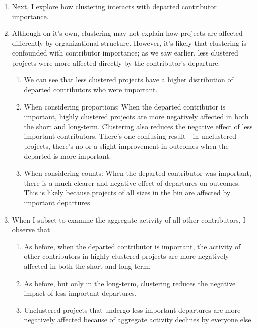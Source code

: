 \subsubsection{}
\begin{enumerate}
    \item Next, I explore how clustering interacts with departed contributor importance. 
    \item Although on it's own, clustering may not explain how projects are affected differently by organizational structure. However, it's likely that clustering is confounded with contributor importance; as we saw earlier, less clustered projects were more affected directly by the contributor's departure. 
    \begin{enumerate}
        \item We can see that less clustered projects have a higher distribution of departed contributors who were important.
        \item When considering proportions: When the departed contributor is important, highly clustered projects are more negatively affected in both the short and long-term. Clustering also reduces the negative effect of less important contributors. 
        There's one confusing result - in unclustered projects, there's no or a slight improvement in outcomes when the departed is more important.  
        \item When considering counts: When the departed contributor was important, there is a much clearer and negative effect of departures on outcomes. This is likely because projects of all sizes in the bin are affected by important departures. 
    \end{enumerate}
    \item When I subset to examine the aggregate activity of all other contributors, I observe that
    \begin{enumerate}
        \item As before, when the departed contributor is important, the activity of other contributors in highly clustered projects are more negatively affected in both the short and long-term. 
        \item As before, but only in the long-term, clustering reduces the negative impact of less important departures. 
        \item Unclustered projects that undergo less important departures are more negatively affected because of aggregate activity declines by everyone else. 

\end{enumerate}
\end{enumerate}
